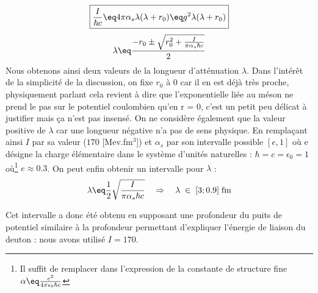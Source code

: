 \begin{equation*}
    \boxed{
        \frac{I} {\hbar c}\eq 4\pi \alpha_s \lambda(\lambda + r_0)
        \eq g^2\lambda(\lambda + r_0)}
\end{equation*}
\begin{equation*}
    \lambda \eq \frac{-r_0 \pm \sqrt{r_0^2 + \frac{I}{\pi\alpha_s\hbar c}}}{2}
\end{equation*}
Nous obtenons ainsi deux valeurs de la longueur d'atténuation $\lambda$. Dans l'intérêt de la simplicité de la discussion, on fixe $r_0$ à 0 car il en est déjà très proche, physiquement parlant cela revient à dire que l'exponentielle liée au méson ne prend le pas sur le potentiel coulombien qu'en r = 0, c'est un petit peu délicat à justifier mais ça n'est pas insensé. On ne considère également que la valeur positive de $\lambda$ car une longueur négative n'a pas de sens physique. En remplaçant ainsi $I$ par sa valeur ($170$ [Mev.fm$^3$]) et $\alpha_s$ par son intervalle possible $[e,1]$ où e désigne la charge élémentaire dans le système d'unités naturelles : $\hbar = c = \epsilon_0 = 1$ où\footnote{Il suffit de remplacer dans l'expression de la constante de structure fine $\alpha \eq \frac{e^2}{4\pi\epsilon_0 \hbar c}$} $e \approx 0.3$. On peut enfin obtenir un intervalle pour $\lambda$ :
\begin{equation*}
    \lambda \eq \dfrac{1}{2} \sqrt{\frac{I}{\pi\alpha_s\hbar c}}
    \quad \Rightarrow \quad
    \lambda \;\in\; [3;0.9]\; \text{fm}
\end{equation*}

Cet intervalle a donc été obtenu en supposant une profondeur du puits de potentiel similaire à la profondeur permettant d'expliquer l'énergie de liaison du deuton : nous avons utilisé $I=170$.\\

